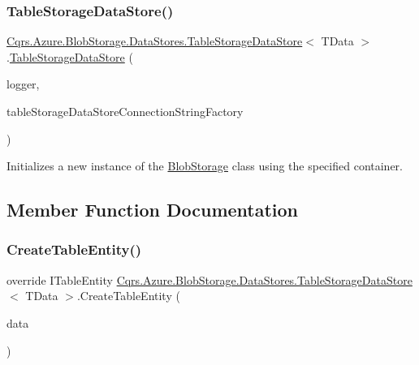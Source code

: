 \subsubsection{\texorpdfstring{Table\+Storage\+Data\+Store()}{TableStorageDataStore()}}
{\footnotesize\ttfamily \hyperlink{classCqrs_1_1Azure_1_1BlobStorage_1_1DataStores_1_1TableStorageDataStore}{Cqrs.\+Azure.\+Blob\+Storage.\+Data\+Stores.\+Table\+Storage\+Data\+Store}$<$ T\+Data $>$.\hyperlink{classCqrs_1_1Azure_1_1BlobStorage_1_1DataStores_1_1TableStorageDataStore}{Table\+Storage\+Data\+Store} (\begin{DoxyParamCaption}\item[{I\+Logger}]{logger,  }\item[{\hyperlink{interfaceCqrs_1_1Azure_1_1BlobStorage_1_1DataStores_1_1ITableStorageDataStoreConnectionStringFactory}{I\+Table\+Storage\+Data\+Store\+Connection\+String\+Factory}}]{table\+Storage\+Data\+Store\+Connection\+String\+Factory }\end{DoxyParamCaption})}



Initializes a new instance of the \hyperlink{namespaceCqrs_1_1Azure_1_1BlobStorage}{Blob\+Storage} class using the specified container. 



\subsection{Member Function Documentation}
\mbox{\label{classCqrs_1_1Azure_1_1BlobStorage_1_1DataStores_1_1TableStorageDataStore_ac28ce10858480acc61d3a3df4fb3dae4_ac28ce10858480acc61d3a3df4fb3dae4}} 
\subsubsection{\texorpdfstring{Create\+Table\+Entity()}{CreateTableEntity()}}
{\footnotesize\ttfamily override I\+Table\+Entity \hyperlink{classCqrs_1_1Azure_1_1BlobStorage_1_1DataStores_1_1TableStorageDataStore}{Cqrs.\+Azure.\+Blob\+Storage.\+Data\+Stores.\+Table\+Storage\+Data\+Store}$<$ T\+Data $>$.Create\+Table\+Entity (\begin{DoxyParamCaption}\item[{T\+Data}]{data }\end{DoxyParamCaption})\hspace{0.3cm}{\ttfamily [protected]}}

